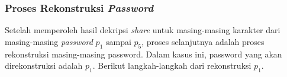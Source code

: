 \subsubsection{Proses Rekonstruksi \textit{Password}}

Setelah memperoleh hasil dekripsi \textit{share} untuk masing-masing karakter dari masing-masing \textit{password} \begin{math}p_1\end{math} sampai \begin{math}p_5\end{math}, proses selanjutnya adalah proses rekonstruksi masing-masing password. Dalam kasus ini, password yang akan direkonstruksi adalah \begin{math}p_1\end{math}. Berikut langkah-langkah dari rekonstruksi \begin{math}p_1\end{math}.

